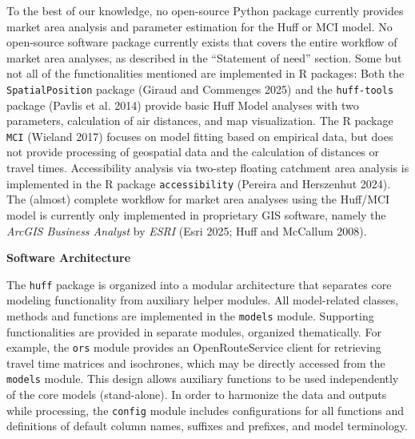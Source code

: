 \documentclass[
]{article}
\begin{document}
To the best of our knowledge, no open-source Python package currently
provides market area analysis and parameter estimation for the Huff or
MCI model. No open-source software package currently exists that covers
the entire workflow of market area analyses, as described in the
``Statement of need'' section. Some but not all of the functionalities
mentioned are implemented in R packages: Both the
\texttt{SpatialPosition} package (Giraud and Commenges 2025) and the
\texttt{huff-tools} package (Pavlis et al. 2014) provide basic Huff
Model analyses with two parameters, calculation of air distances, and
map visualization. The R package \texttt{MCI} (Wieland 2017) focuses on
model fitting based on empirical data, but does not provide processing
of geospatial data and the calculation of distances or travel times.
Accessibility analysis via two-step floating catchment area analysis is
implemented in the R package \texttt{accessibility} (Pereira and
Herszenhut 2024). The (almost) complete workflow for market area
analyses using the Huff/MCI model is currently only implemented in
proprietary GIS software, namely the \emph{ArcGIS Business Analyst} by
\emph{ESRI} (Esri 2025; Huff and McCallum 2008).

\textbf{Software Architecture}

The \texttt{huff} package is organized into a modular architecture that
separates core modeling functionality from auxiliary helper modules. All
model-related classes, methods and functions are implemented in the
\texttt{models} module. Supporting functionalities are provided in
separate modules, organized thematically. For example, the \texttt{ors}
module provides an OpenRouteService client for retrieving travel time
matrices and isochrones, which may be directly accessed from the
\texttt{models} module. This design allows auxiliary functions to be
used independently of the core models (stand-alone). In order to
harmonize the data and outputs while processing, the \texttt{config}
module includes configurations for all functions and definitions of
default column names, suffixes and prefixes, and model terminology.
\end{document}
